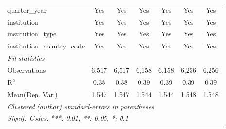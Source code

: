 \begin{tabular}{lcccccc}
   quarter\_year                      & Yes     & Yes     & Yes     & Yes     & Yes     & Yes\\  
   institution                        & Yes     & Yes     & Yes     & Yes     & Yes     & Yes\\  
   institution\_type                  & Yes     & Yes     & Yes     & Yes     & Yes     & Yes\\  
   institution\_country\_code         & Yes     & Yes     & Yes     & Yes     & Yes     & Yes\\  
   \midrule
   \emph{Fit statistics}\\
   Observations                       & 6,517   & 6,517   & 6,158   & 6,158   & 6,256   & 6,256\\  
   R$^2$                              & 0.38    & 0.38    & 0.39    & 0.39    & 0.39    & 0.39\\  
Mean(Dep. Var.) & 1.547 & 1.547 & 1.544 & 1.544 & 1.548 & 1.548 \\
   \midrule \midrule
   \multicolumn{7}{l}{\emph{Clustered (author) standard-errors in parentheses}}\\
   \multicolumn{7}{l}{\emph{Signif. Codes: ***: 0.01, **: 0.05, *: 0.1}}\\
\end{tabular}
\par\endgroup
